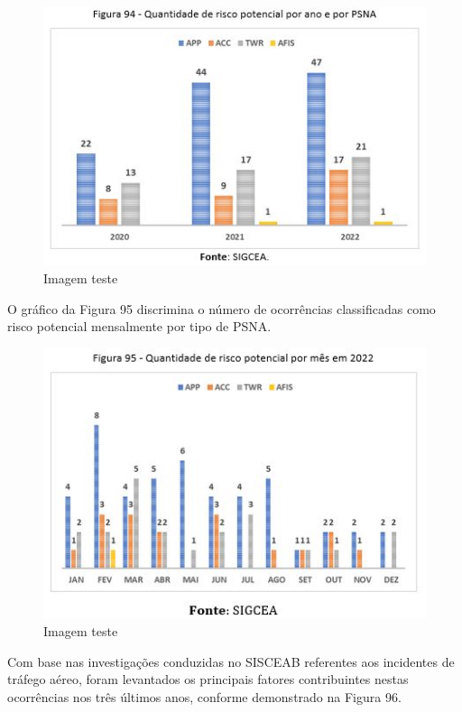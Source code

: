 \documentclass[
]{book}
\begin{document}
\begin{figure}
\centering
\includegraphics{imagens/fig81.jpg}
\caption{Imagem teste}
\end{figure}

O gráfico da Figura 95 discrimina o número de ocorrências classificadas como risco potencial mensalmente por tipo de PSNA.

\begin{figure}
\centering
\includegraphics{imagens/fig82.jpg}
\caption{Imagem teste}
\end{figure}

Com base nas investigações conduzidas no SISCEAB referentes aos incidentes de tráfego aéreo, foram levantados os principais fatores contribuintes nestas ocorrências nos três últimos anos, conforme demonstrado na Figura 96.
\end{document}
